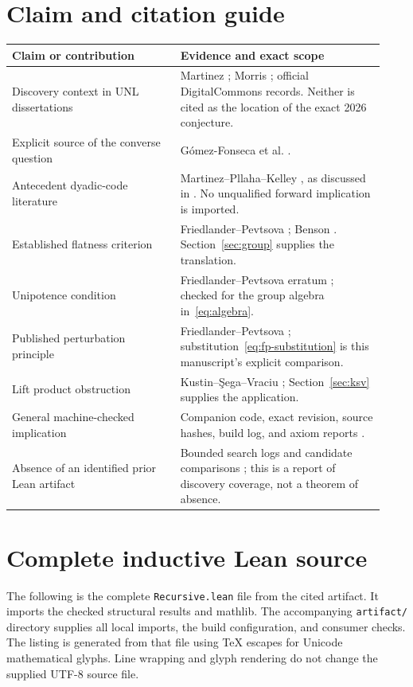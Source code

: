 \documentclass[11pt]{article}
\theoremstyle{definition}
\begin{document}
\section{Claim and citation guide}\label{app:citations}
\begin{longtable}{@{}>{\raggedright\arraybackslash}p{0.42\linewidth}>{\raggedright\arraybackslash}p{0.51\linewidth}@{}}
\toprule
Claim or contribution & Evidence and exact scope\\
\midrule
\endhead
Discovery context in UNL dissertations & Martinez \cite{martinez}; Morris \cite{morris}; official DigitalCommons records. Neither is cited as the location of the exact 2026 conjecture.\\
Explicit source of the converse question & G\'omez-Fonseca et al. \cite[Remark~3.4]{gf}.\\
Antecedent dyadic-code literature & Martinez--Pllaha--Kelley \cite{mpk}, as discussed in \cite[Remark~3.4]{gf}. No unqualified forward implication is imported.\\
Established flatness criterion & Friedlander--Pevtsova \cite[Example~2.6]{fp}; Benson \cite[Section~1.4]{benson}. Section~\ref{sec:group} supplies the translation.\\
Unipotence condition & Friedlander--Pevtsova erratum \cite{fperr}; checked for the group algebra in~\eqref{eq:algebra}.\\
Published perturbation principle & Friedlander--Pevtsova \cite[Proposition~2.2]{fp}; substitution~\eqref{eq:fp-substitution} is this manuscript's explicit comparison.\\
Lift product obstruction & Kustin--\c{S}ega--Vraciu \cite[Proposition~1.9]{ksv}; Section~\ref{sec:ksv} supplies the application.\\
General machine-checked implication & Companion code, exact revision, source hashes, build log, and axiom reports \cite{artifact}.\\
Absence of an identified prior Lean artifact & Bounded search logs and candidate comparisons \cite{artifact}; this is a report of discovery coverage, not a theorem of absence.\\
\bottomrule
\end{longtable}



\clearpage
\section{Complete inductive Lean source}\label{app:lean}
The following is the complete \texttt{Recursive.lean} file from the cited artifact. It imports the checked structural results and mathlib. The accompanying \texttt{artifact/} directory supplies all local imports, the build configuration, and consumer checks. The listing is generated from that file using TeX escapes for Unicode mathematical glyphs. Line wrapping and glyph rendering do not change the supplied UTF-8 source file.

\end{document}
